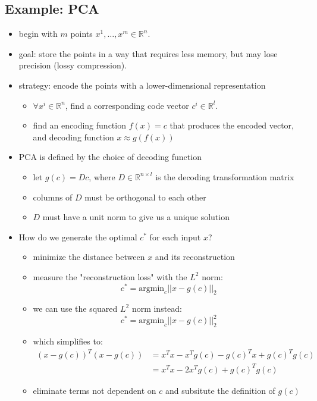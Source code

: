 \subsection{Example: PCA}
\begin{itemize}
    \item begin with $m$ points ${x^1, \dots, x^m} \in \mathbb{R}^n$.
    \item goal: store the points in a way that requires less memory, but may lose precision (lossy compression).
    \item strategy: encode the points with a lower-dimensional representation
    \begin{itemize}
        \item $\forall x^i \in \mathbb{R}^n$, find a corresponding code vector $c^i \in \mathbb{R}^l$.
        \item find an encoding function $f(x) = c$ that produces the encoded vector, and decoding function $x \approx g(f(x))$
    \end{itemize}
    \item PCA is defined by the choice of decoding function
    \begin{itemize}
        \item let $g(c) = Dc$, where $ D \in \mathbb{R}^{n \times l}$ is the decoding transformation matrix
        \item columns of $D$ must be orthogonal to each other
        \item $D$ must have a unit norm to give us a unique solution
    \end{itemize}
    \item How do we generate the optimal $c^*$ for each input $x$?
    \begin{itemize}
        \item minimize the distance between $x$ and its reconstruction
        \item measure the "reconstruction loss" with the $L^2$ norm:
        $$ c^* = \text{argmin}_c ||x-g(c)||_2 $$
        \item we can use the squared $L^2$ norm instead:
        $$ c^* = \text{argmin}_c ||x-g(c)||_2^2 $$
        \item which simplifies to:
        \begin{align}
            (x - g(c))^T(x - g(c)) &= x^Tx - x^Tg(c) - g(c)^Tx + g(c)^Tg(c) \\
            &= x^Tx - 2x^Tg(c) + g(c)^Tg(c)
        \end{align}
        \item eliminate terms not dependent on $c$ and subsitute the definition of $g(c)$

\end{itemize}
\end{itemize}
